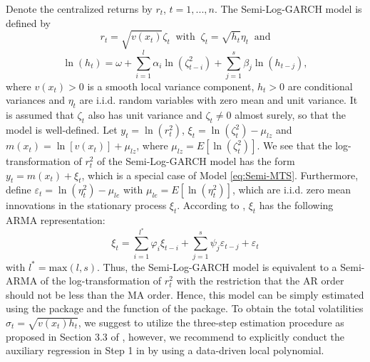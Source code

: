 Denote the centralized returns by $r_t$, $t=1, ..., n$. The Semi-Log-GARCH model is defined by
\begin{equation} \label{eq:rt}
r_{t} = \sqrt{v\left(x_{t}\right)}\zeta_{t} \ \text{ with } \ \zeta_{t} = \sqrt{h_{t}}\eta_{t} \ \text{ and} 
\end{equation} 
\begin{equation} \label{eq:lnht}
\ln\left(h_{t}\right) = \omega + \sum_{i=1}^{l}\alpha_{i}\ln\left(\zeta_{t-i}^{2}\right) + \sum_{j=1}^{s}\beta_{j}\ln\left(h_{t-j}\right),
\end{equation}
where $v\left(x_{t}\right) > 0$ is a smooth local variance component, $h_t>0$ are conditional variances and $\eta_{t}$ are i.i.d. random variables with zero mean and unit variance. It is assumed that $\zeta_t$ also has unit variance and $\zeta_{t}\ne 0$ almost surely, so that the model is well-defined. 
Let $y_t=\ln\left(r_t^2\right)$,  $\xi_t=\ln\left(\zeta_t^2\right)-\mu_{lz}$ and $m\left(x_t\right)=\ln\left[v\left(x_t\right)\right] +\mu_{lz}$, where $\mu_{lz}=E\left[\ln\left(\zeta_t^2\right)\right]$. We see that the log-transformation of $r_t^2$ of the Semi-Log-GARCH model has the form $y_t=m\left(x_t\right)+\xi_t$, which is a special case of Model \eqref{eq:Semi-MTS}. Furthermore, define $\varepsilon_t=\ln\left(\eta_t^2\right)-\mu_{le}$ with $\mu_{le}=E\left[\ln\left(\eta_t^2\right)\right]$, which are i.i.d. zero mean innovations in the stationary process $\xi_t$. According to \cite{francq2018exponential}, $\xi_t$ has the following ARMA representation: 
\begin{equation}\label{eq:lgARMA}
\xi_t = \sum_{i=1}^{l^{*}}\varphi_{i}\xi_{t-i} + \sum_{j=1}^{s}\psi_{j}\varepsilon_{t-j} + \varepsilon_{t}  
\end{equation}
with $l^{*} = \text{max}(l, s)$. Thus, the Semi-Log-GARCH model is equivalent to a Semi-ARMA of the log-transformation of $r_t^2$ with the restriction that the AR order should not be less than the MA order. Hence, this model can be simply estimated using the  package and the  function of the  package. To obtain the total volatilities $\sigma_t=\sqrt{v\left(x_{t}\right)h_{t}}$, we suggest to utilize the three-step estimation procedure as proposed in Section 3.3 of \citet{sucarrat2019log}, however, we recommend to explicitly conduct the auxiliary regression in Step 1 in \citet{sucarrat2019log} by using a data-driven local polynomial.
